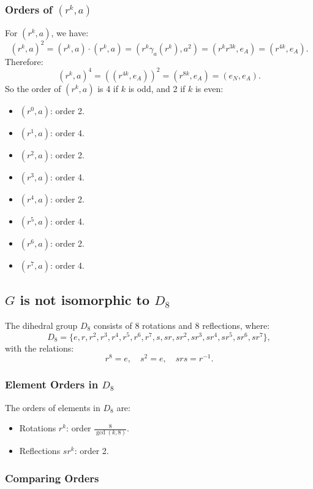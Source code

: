 \documentclass[12pt]{amsart}
\theoremstyle{definition}
\numberwithin{equation}{section}
\begin{document}
\begin{exercise}{5}
    \subsubsection*{Orders of \((r^k, a)\)}

    For \((r^k, a)\), we have:
    \[
    (r^k, a)^2 = (r^k, a) \cdot (r^k, a) = (r^k \gamma_a(r^k), a^2) = (r^k r^{3k}, e_A) = (r^{4k}, e_A).
    \]
    Therefore:
    \[
    (r^k, a)^4 = ((r^{4k}, e_A))^2 = (r^{8k}, e_A) = (e_N, e_A).
    \]
    So the order of \((r^k, a)\) is 4 if \(k\) is odd, and 2 if \(k\) is even:
    \begin{itemize}
        \item \((r^0, a)\): order 2.
        \item \((r^1, a)\): order 4.
        \item \((r^2, a)\): order 2.
        \item \((r^3, a)\): order 4.
        \item \((r^4, a)\): order 2.
        \item \((r^5, a)\): order 4.
        \item \((r^6, a)\): order 2.
        \item \((r^7, a)\): order 4.
    \end{itemize}

    \subsection*{\(G\) is not isomorphic to \(D_8\)}

    The dihedral group \(D_8\) consists of 8 rotations and 8 reflections, where:
    \[
    D_8 = \{e, r, r^2, r^3, r^4, r^5, r^6, r^7, s, sr, sr^2, sr^3, sr^4, sr^5, sr^6, sr^7\},
    \]
    with the relations:
    \[
    r^8 = e, \quad s^2 = e, \quad srs = r^{-1}.
    \]

    \subsubsection*{Element Orders in \(D_8\)}

    The orders of elements in \(D_8\) are:
    \begin{itemize}
        \item Rotations \(r^k\): order \(\frac{8}{\gcd(k, 8)}\).
        \item Reflections \(sr^k\): order 2.
    \end{itemize}

    \subsubsection*{Comparing Orders}


\end{exercise}
\end{document}

